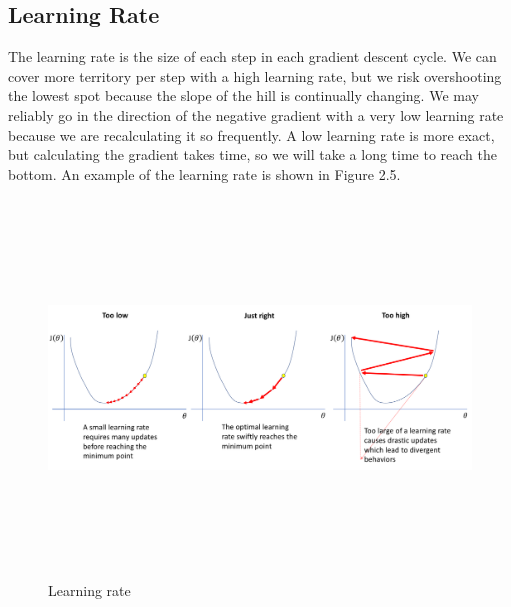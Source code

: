 \subsection{Learning Rate}
\label{subsec:learning_rate}
The learning rate is the size of each step in each gradient descent cycle. We can cover more territory per step with a high learning rate, but we risk overshooting the lowest spot because the slope of the hill is continually changing. We may reliably go in the direction of the negative gradient with a very low learning rate because we are recalculating it so frequently. A low learning rate is more exact, but calculating the gradient takes time, so we will take a long time to reach the bottom. An example of the learning rate is shown in Figure 2.5.
\newpage
\begin{figure}[!h]
	\centering
	\includegraphics[width=\linewidth, height=10cm,keepaspectratio]{figures/learning rate.png}
   \caption{Learning rate}
\end{figure}

